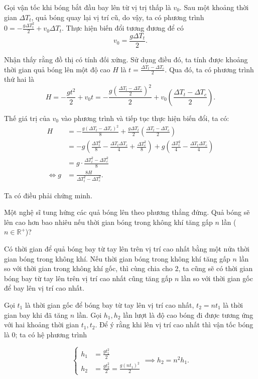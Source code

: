 \documentclass[a4paper, titlepage, openany]{book}
\newcounter{exercise}
\newcounter{solution}
\begin{document}
\solution

Gọi vận tốc khi bóng bắt đầu bay lên từ vị trị thấp là $v_0$. Sau một khoảng thời gian $\Delta T_t$, quả bóng quay lại vị trí cũ, do vậy, ta có phương trình $0 = -\frac{g \Delta T_t^2}{2} + v_0 \Delta T_t$. Thực hiện biến đổi tương đương để có $$v_0=\frac{g \Delta T_t}{2}.$$

Nhận thấy rằng đồ thị có tính đối xứng. Sử dụng điều đó, ta tính được khoảng thời gian quả bóng lên một độ cao $H$ là $t=\frac{\Delta T_t-\Delta T_c}{2}$. Qua đó, ta có phương trình thứ hai là $$H = -\frac{g t^2}{2} + v_0 t=-\frac{g \left(\frac{\Delta T_t-\Delta T_c}{2}\right)^2}{2} + v_0 \left(\frac{\Delta T_t-\Delta T_c}{2}\right).$$

Thế giá trị của $v_0$ vào phương trình và tiếp tục thực hiện biến đổi, ta có:
\begin{align*}
   H &= -\frac{g \left(\Delta T_t-\Delta T_c\right)^2}{8} + \frac{g \Delta T_t}{2} \left(\frac{\Delta T_t-\Delta T_c}{2}\right) \\
   &= -g\left(\frac{\Delta T_t^2}{8} - \frac{\Delta T_t\Delta T_c}{4} + \frac{\Delta T_c^2}{8}\right) + g\left(\frac{\Delta T_t^2}{4} - \frac{\Delta T_t\Delta T_c}{4}\right) \\
   &= g\cdot \frac{\Delta T_t^2 - \Delta T_c^2}{8} \\
   \iff g &= \frac{8H}{\Delta T_t^2 - \Delta T_c^2}.
\end{align*}

Ta có điều phải chứng minh.

\exercise Một nghệ sĩ tung hứng các quả bóng lên theo phương thẳng đứng. Quả bóng sẽ lên cao hơn bao nhiêu nếu thời gian bóng trong không khí tăng gấp $n$ lần ($n \in \mathbb{R}^+$)?

\solution

Có thời gian để quả bóng bay từ tay lên trên vị trí cao nhất bằng một nửa thời gian bóng trong không khí. Nếu thời gian bóng trong không khí tăng gấp $n$ lần so với thời gian trong không khí gốc, thì cùng chia cho $2$, ta cũng sẽ có thời gian bóng bay từ tay lên trên vị trí cao nhất cũng tăng gấp $n$ lần so với thời gian gốc để bay lên vị trí cao nhất.

Gọi $t_1$ là thời gian gốc để bóng bay từ tay lên vị trí cao nhất, $t_2 = n t_1$ là thời gian bay khi đã tăng $n$ lần. Gọi $h_1, h_2$ lần lượt là độ cao bóng đi được tương ứng với hai khoảng thời gian $t_1, t_2$. Để ý rằng khi lên vị trí cao nhất thì vận tốc bóng là $0$; ta có hệ phương trình

\begin{equation*}
   \begin{cases}
      h_1 &= \frac{gt_1^2}{2} \\
      h_2 &= \frac{gt_2^2}{2} = \frac{g\left(nt_1\right)^2}{2}
   \end{cases}
   \implies h_2 = n^2 h_1.
\end{equation*}
\end{document}
